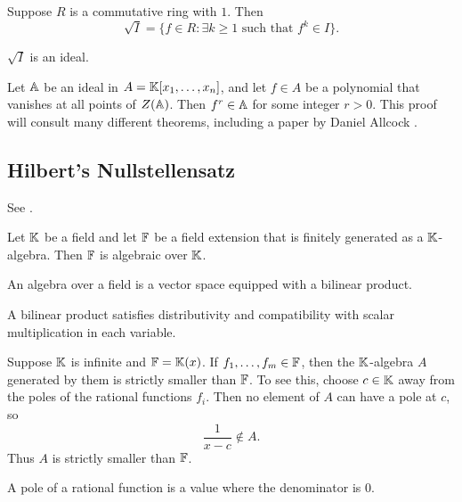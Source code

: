 \begin{definition}
    Suppose $R$ is a commutative ring with $1$.
    Then
    \[
        \sqrt{I} = \{f\in R : \exists k\geq 1 \text{ such that } f^k\in I\}.
    \]
\end{definition}

\begin{lemma*}{
    $\sqrt{I}$ is an ideal.
}
\end{lemma*}

\begin{theorem}{
    Let $\aa$ be an ideal in $A = \kk[x_1,\ldots,x_n]$, and let $f\in A$ be a polynomial that vanishes at all points of $Z(\aa)$.
    Then $f^r\in \aa$ for some integer $r>0$.
}
This proof will consult many different theorems, including a paper by Daniel Allcock \cite{allcock}.
\end{theorem}

\subsection{Hilbert's Nullstellensatz}

See \cite{allcock}.

\begin{theorem*}{
    Let $\kk$ be a field and let $\ff$ be a field extension that is finitely generated as a $\kk$-algebra.
    Then $\ff$ is algebraic over $\kk$.
}
\end{theorem*}

\begin{definition}[Algebra]
    An algebra over a field is a vector space equipped with a bilinear product.
\end{definition}

\begin{definition}[Bilinear]
    A bilinear product satisfies distributivity and compatibility with scalar multiplication in each variable.
\end{definition}

\begin{theorem}{
    Suppose $\kk$ is infinite and $\ff = \kk(x)$.
    If $f_1,\ldots,f_m\in\ff$, then the $\kk$-algebra $A$ generated by them is strictly smaller than $\ff$.
}
To see this, choose $c\in\kk$ away from the poles of the rational functions $f_i$.
Then no element of $A$ can have a pole at $c$, so
\[
    \frac{1}{x-c}\notin A.
\]
Thus $A$ is strictly smaller than $\ff$.
\end{theorem}

\begin{definition}[Pole]
    A pole of a rational function is a value where the denominator is $0$.
\end{definition}

